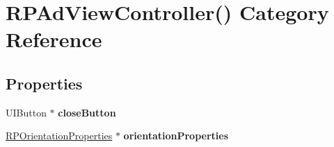 \hypertarget{category_r_p_ad_view_controller_07_08}{\section{R\-P\-Ad\-View\-Controller() Category Reference}
\label{category_r_p_ad_view_controller_07_08}
}
\subsection*{Properties}
\begin{DoxyCompactItemize}
\item 
\hypertarget{category_r_p_ad_view_controller_07_08_a5e1e58cc99159f925566c5bee0aac7e2}{U\-I\-Button $\ast$ {\bfseries close\-Button}}\label{category_r_p_ad_view_controller_07_08_a5e1e58cc99159f925566c5bee0aac7e2}

\item 
\hypertarget{category_r_p_ad_view_controller_07_08_a162eea198b2c83eb3d998c6d2906d654}{\hyperlink{interface_r_p_orientation_properties}{R\-P\-Orientation\-Properties} $\ast$ {\bfseries orientation\-Properties}}\label{category_r_p_ad_view_controller_07_08_a162eea198b2c83eb3d998c6d2906d654}

\end{DoxyCompactItemize}
